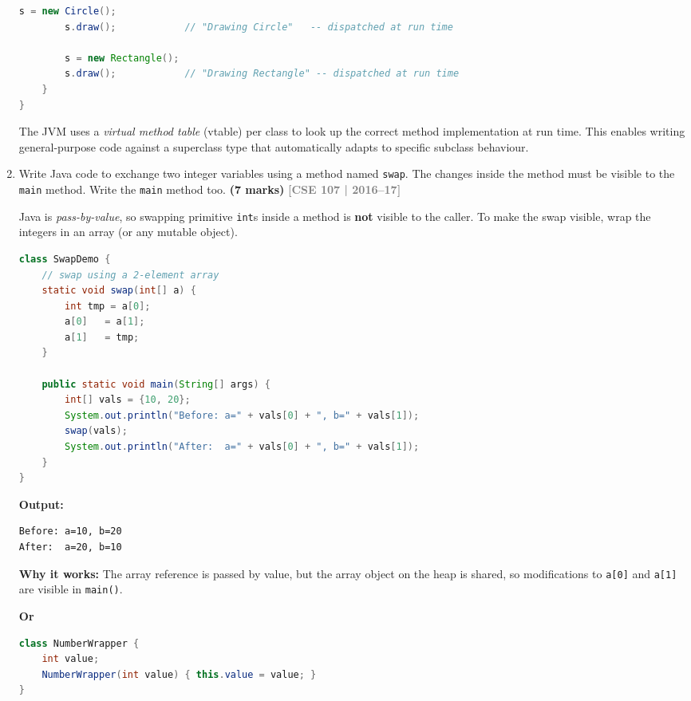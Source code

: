 \documentclass[12pt,a3paper]{article}
\newcommand{\yr}[1]{\hfill\textcolor{gray}{\small\textbf{[#1]}}}
\newcommand{\mk}[1]{\textcolor{orange!70!black}{\small\textbf{(#1 marks)}}}
\begin{document}
\begin{enumerate}
\begin{tcolorbox}[enhanced,breakable,ansbox,
  colback=cC!4,colframe=cC,boxrule=0.8pt,arc=5pt,
  title={\textbf{Answer --- Dynamic Method Dispatching}},
  fonttitle=\bfseries\color{white},colbacktitle=cC]
\begin{lstlisting}[language=Java]
        s = new Circle();
        s.draw();            // "Drawing Circle"   -- dispatched at run time

        s = new Rectangle();
        s.draw();            // "Drawing Rectangle" -- dispatched at run time
    }
}
\end{lstlisting}

The JVM uses a \emph{virtual method table} (vtable) per class to look
up the correct method implementation at run time. This enables writing
general-purpose code against a superclass type that automatically
adapts to specific subclass behaviour.
\end{tcolorbox}

\item Write Java code to exchange two integer variables using a method named \texttt{swap}. The changes inside the method must be visible to the \texttt{main} method. Write the \texttt{main} method too. \mk{7}
\yr{CSE 107 | 2016--17}

\begin{tcolorbox}[enhanced,breakable,ansbox,
  colback=cC!4,colframe=cC,boxrule=0.8pt,arc=5pt,
  title={\textbf{Answer --- swap() Visible to main()}},
  fonttitle=\bfseries\color{white},colbacktitle=cC]

Java is \emph{pass-by-value}, so swapping primitive \texttt{int}s
inside a method is \textbf{not} visible to the caller. To make the
swap visible, wrap the integers in an array (or any mutable object).

\begin{lstlisting}[language=Java]
class SwapDemo {
    // swap using a 2-element array
    static void swap(int[] a) {
        int tmp = a[0];
        a[0]   = a[1];
        a[1]   = tmp;
    }

    public static void main(String[] args) {
        int[] vals = {10, 20};
        System.out.println("Before: a=" + vals[0] + ", b=" + vals[1]);
        swap(vals);
        System.out.println("After:  a=" + vals[0] + ", b=" + vals[1]);
    }
}
\end{lstlisting}
\textbf{Output:}
\begin{verbatim}
Before: a=10, b=20
After:  a=20, b=10
\end{verbatim}
\textbf{Why it works:} The array reference is passed by value, but the
array object on the heap is shared, so modifications to \texttt{a[0]}
and \texttt{a[1]} are visible in \texttt{main()}.


\textbf{Or}
\begin{lstlisting}[language=java]
class NumberWrapper {
    int value;
    NumberWrapper(int value) { this.value = value; }
}


\end{lstlisting}
\end{tcolorbox}
\end{enumerate}
\end{document}
